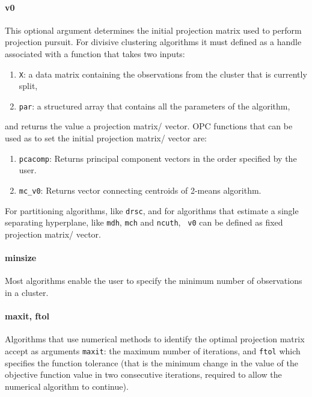 \documentclass{book}
\begin{document}
\paragraph{v0}
%
This optional argument determines the initial projection matrix used to
perform projection pursuit. For divisive clustering algorithms it must
defined as a handle associated with a function that takes two inputs:
%
\begin{enumerate}
	
\item {\tt X}: a data matrix containing the observations from the cluster that is currently split,

\item {\tt par}: a structured array that contains all the parameters of the algorithm,

\end{enumerate}
%
and returns the value a projection matrix/ vector. 
%
OPC functions that can be used as to set the initial projection matrix/ vector are:

\begin{enumerate}

\item {\tt pcacomp}: Returns principal component vectors in the order specified by the user.

\item {\tt mc\_v0}: Returns vector connecting centroids of 2-means algorithm.
\end{enumerate}

\noindent
For partitioning algorithms, like {\tt drsc}, and for algorithms that estimate
a single separating hyperplane, like {\tt mdh}, {\tt mch} and {\tt ncuth}, {\tt
v0} can be defined as fixed projection matrix/ vector.

\paragraph{minsize}
%
Most algorithms enable the user to specify the minimum number of observations in a cluster.


\paragraph{maxit, ftol}
%
Algorithms that use numerical methods to identify the optimal projection matrix
accept as arguments {\tt maxit}: the maximum number of iterations,
and {\tt ftol} which specifies the function tolerance (that is
the minimum change in the value of the objective function
value in two consecutive iterations, required to allow the numerical
algorithm to continue).
\end{document}
